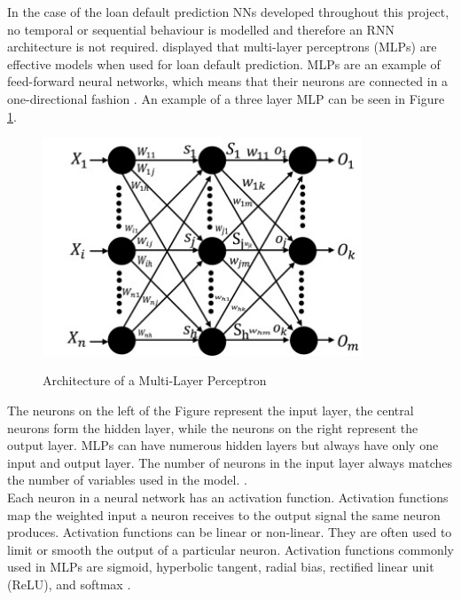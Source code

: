 In the case of the loan default prediction NNs developed throughout this project, no temporal or sequential behaviour is modelled and therefore an RNN architecture is not required. \textcite{NNWest} displayed that multi-layer perceptrons (MLPs) are effective models when used for loan default prediction. MLPs are an example of feed-forward neural networks, which means that their neurons are connected in a one-directional fashion \parencite{NNOverview}. An example of a three layer MLP can be seen in Figure \ref{fig:MLP}.

\vspace{10 pt}

\begin{figure}[!htb]
\centering
\includegraphics[width=0.85\textwidth]{images/mlp.jpg}
\caption{Architecture of a Multi-Layer Perceptron}
\label{fig:MLP}
\parencite{MLP}
\end{figure}

\vspace{10 pt}

The neurons on the left of the Figure represent the input layer, the central neurons form the hidden layer, while the neurons on the right represent the output layer. MLPs can have numerous hidden layers but always have only one input and output layer. The number of neurons in the input layer always matches the number of variables used in the model.  \parencite{MLP}. \\

Each neuron in a neural network has an activation function. Activation functions map the weighted input a neuron receives to the output signal the same neuron produces. Activation functions can be linear or non-linear. They are often used to limit or smooth the output of a particular neuron. Activation functions commonly used in MLPs are sigmoid, hyperbolic tangent, radial bias, rectified linear unit (ReLU), and softmax \parencite{activation_functions}. \\


